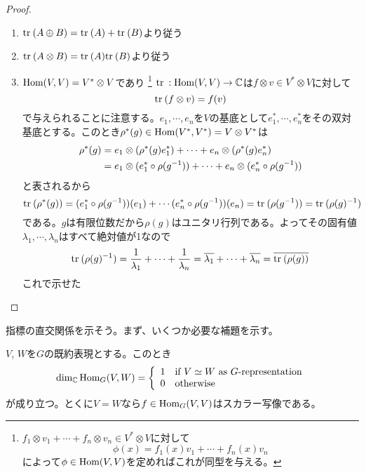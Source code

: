 \documentclass{ltjsreport}
\begin{document}
\begin{proof}
  \begin{enumerate}
    \item $\text{tr}\:(A\oplus B)=\text{tr}\:(A)+\text{tr}\:(B)$より従う
    \item $\text{tr}\:(A\otimes B)=\text{tr}\:(A)\text{tr}\:(B)$より従う
    \item $\text{Hom}(V,V)= V^*\otimes V$であり
    \footnote{$f_1\otimes v_1+\cdots+f_n\otimes v_n\in V^*\otimes V$に対して
    \[
    \phi(x)=f_1(x)v_1+\cdots+f_n(x)v_n
    \]
    によって$\phi\in\text{Hom}(V,V)$を定めればこれが同型を与える。
    }
    $\text{tr}\::\text{Hom}(V,V)\rightarrow \mathbb{C}$は$f\otimes v\in V^*\otimes V$に対して
    \[
    \text{tr}\:(f\otimes v)=f(v)
    \]
    で与えられることに注意する。$e_1,\cdots,e_n$を$V$の基底として$e_1^*,\cdots,e_n^*$をその双対基底とする。このとき$\rho^*(g)\in\text{Hom}(V^*,V^*)=V\otimes V^*$は
    \begin{align*}
    \rho^*(g)
    &=e_1\otimes(\rho^*(g)e_1^*)+\cdots+e_n\otimes(\rho^*(g)e_n^*)  \\
    &=e_1\otimes(e_1^*\circ\rho(g^{-1}))+\cdots+e_n\otimes(e_n^*\circ\rho(g^{-1}))
    \end{align*}
    と表されるから
    \[
    \text{tr}\:(\rho^*(g))=(e_1^*\circ\rho(g^{-1}))(e_1)+\cdots (e_n^*\circ\rho(g^{-1}))(e_n)=\text{tr}\:(\rho(g^{-1}))=\text{tr}\:(\rho(g)^{-1})
    \]
    である。$g$は有限位数だから$\rho(g)$はユニタリ行列である。よってその固有値$\lambda_1,\cdots,\lambda_n$はすべて絶対値が1なので
    \[
    \text{tr}\:(\rho(g)^{-1})=\frac{1}{\lambda_1}+\cdots+\frac{1}{\lambda_n}=\overline{\lambda_1}+\cdots+\overline{\lambda_n}=\overline{\text{tr}\:(\rho(g))}
    \]
    これで示せた
  \end{enumerate}
\end{proof}




指標の直交関係を示そう。まず、いくつか必要な補題を示す。
\begin{lemm}[Schurの補題]\label{schur_lem}
  $V$, $W$を$G$の既約表現とする。このとき
  \[
  \dim_{\mathbb{C}}\text{Hom}_G(V,W)=\left\{\begin{array}{cl}
    1 & \text{if $V\simeq W$ as $G$-representation}\\
    0 & \text{otherwise}
  \end{array}\right.
  \]
  が成り立つ。とくに$V=W$なら$f\in\text{Hom}_G(V,V)$はスカラー写像である。
\end{lemm}
\end{document}
